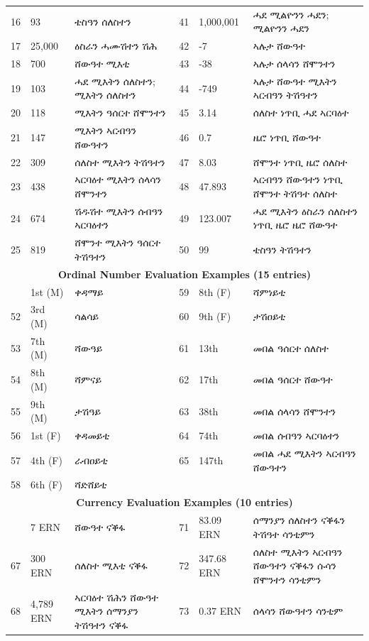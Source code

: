 \documentclass{article}
\newcommand{\ti}[1]{{\geezfont #1}}
\begin{document}
\begin{longtable}{@{\hspace{1pt}}llp{5.65cm}|llp{5.65cm}@{\hspace{1pt}}}
16 & 93 & \ti{ቴስዓን ሰለስተን} & 41 & 1{,}000{,}001 & \ti{ሓደ ሚልዮንን ሓደን; ሚልዮንን ሓደን} \\
17 & 25{,}000 & \ti{ዕስራን ሓሙሽተን ሽሕ} & 42 & -7 & \ti{ኣሉታ ሸውዓተ} \\
18 & 700 & \ti{ሸውዓተ ሚእቲ} & 43 & -38 & \ti{ኣሉታ ሰላሳን ሸሞንተን} \\
19 & 103 & \ti{ሓደ ሚእትን ሰለስተን; ሚእትን ሰለስተን} & 44 & -749 & \ti{ኣሉታ ሸውዓተ ሚእትን ኣርብዓን ትሽዓተን} \\
20 & 118 & \ti{ሚእትን ዓሰርተ ሸሞንተን} & 45 & 3.14 & \ti{ሰለስተ ነጥቢ ሓደ ኣርባዕተ} \\
21 & 147 & \ti{ሚእትን ኣርብዓን ሸውዓተን} & 46 & 0.7 & \ti{ዜሮ ነጥቢ ሸውዓተ} \\
22 & 309 & \ti{ሰለስተ ሚእትን ትሽዓተን} & 47 & 8.03 & \ti{ሸሞንተ ነጥቢ ዜሮ ሰለስተ} \\
23 & 438 & \ti{ኣርባዕተ ሚእትን ሰላሳን ሸሞንተን} & 48 & 47.893 & \ti{ኣርብዓን ሸውዓተን ነጥቢ ሸሞንተ ትሽዓተ ሰለስተ} \\
24 & 674 & \ti{ሽዱሽተ ሚእትን ሰብዓን ኣርባዕተን} & 49 & 123.007 & \ti{ሓደ ሚእትን ዕስራን ሰለስተን ነጥቢ ዜሮ ዜሮ ሸውዓተ} \\
25 & 819 & \ti{ሸሞንተ ሚእትን ዓሰርተ ትሽዓተን} & 50 & 99 & \ti{ቴስዓን ትሽዓተን} \\
\midrule
\multicolumn{6}{c}{\textbf{Ordinal Number Evaluation Examples (15 entries)}} \\
\addlinespace
51 & 1st (M) & \ti{ቀዳማይ} & 59 & 8th (F) & \ti{ሻምነይቲ} \\
52 & 3rd (M) & \ti{ሳልሳይ} & 60 & 9th (F) & \ti{ታሽዐይቲ} \\
53 & 7th (M) & \ti{ሻውዓይ} & 61 & 13th & \ti{መበል ዓሰርተ ሰለስተ} \\
54 & 8th (M) & \ti{ሻምናይ} & 62 & 17th & \ti{መበል ዓሰርተ ሸውዓተ} \\
55 & 9th (M) & \ti{ታሽዓይ} & 63 & 38th & \ti{መበል ሰላሳን ሸሞንተን} \\
56 & 1st (F) & \ti{ቀዳመይቲ} & 64 & 74th & \ti{መበል ሰብዓን ኣርባዕተን} \\
57 & 4th (F) & \ti{ራብዐይቲ} & 65 & 147th & \ti{መበል ሓደ ሚእትን ኣርብዓን ሸውዓተን} \\
58 & 6th (F) & \ti{ሻድሸይቲ} & & & \\
\midrule
\multicolumn{6}{c}{\textbf{Currency Evaluation Examples (10 entries)}} \\
\addlinespace
66 & 7 ERN & \ti{ሸውዓተ ናቕፋ} & 71 & 83.09 ERN & \ti{ሰማንያን ሰለስተን ናቕፋን ትሽዓተ ሳንቲምን} \\
67 & 300 ERN & \ti{ሰለስተ ሚእቲ ናቕፋ} & 72 & 347.68 ERN & \ti{ሰለስተ ሚእትን ኣርብዓን ሸውዓተን ናቕፋን ሱሳን ሸሞንተን ሳንቲምን} \\
68 & 4{,}789 ERN & \ti{ኣርባዕተ ሽሕን ሸውዓተ ሚእትን ሰማንያን ትሽዓተን ናቕፋ} & 73 & 0.37 ERN & \ti{ሰላሳን ሸውዓተን ሳንቲም} \\

\end{longtable}
\end{document}
